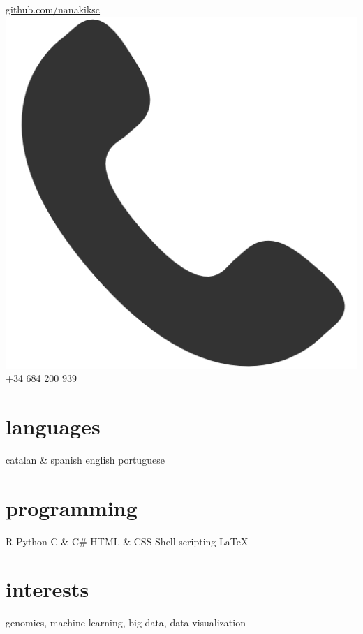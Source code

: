 \documentclass[]{friggeri-cv} %
\begin{document}
\begin{aside}
  \href{https://github.com/nanakiksc}{github.com/nanakiksc}
  \includegraphics[scale=0.6]{phonelogo.png}
  \href{tel:+34684200939}{+34 684 200 939}
  \section{languages}
  catalan \& spanish
  english
  portuguese
  \section{programming}
  {\color{red} \FA \faHeart} R
  Python
  C \& C\#
  HTML \& CSS
  Shell scripting
  \LaTeX
\end{aside}


\section{interests}

genomics, machine learning, big data, data visualization

\end{document}
